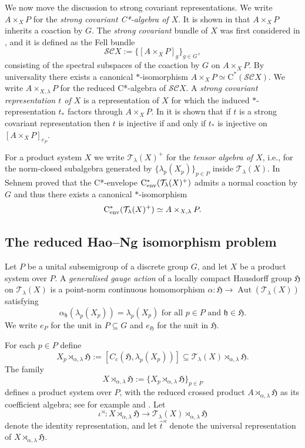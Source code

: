 \documentclass[11pt,final]{amsart}
\numberwithin{equation}{section}
\theoremstyle{plain}
\theoremstyle{definition}
\theoremstyle{remark}
\newcommand{\C}{{\mathcal{C}}}
\renewcommand{\S}{{\mathcal{S}}}
\newcommand{\T}{{\mathcal{T}}}
\def\al{\alpha}
\def\io{\iota}
\def\la{\lambda}
\newcommand{\fH}{{\mathfrak{H}}}
\newcommand{\fh}{{\mathfrak{h}}}
\newcommand{\foral}{\text{ for all }}
\newcommand{\ca}{\mathrm{C}^*}
\newcommand{\cenv}{\mathrm{C}^*_{\textup{env}}}
\newcommand{\wh}{\widehat}
\newcommand{\Aut}{\operatorname{Aut}}
\begin{document}
We now move the discussion to strong covariant representations.
We write $A \times_X P$ for the \emph{strong covariant C*-algebra of $X$}.
It is shown in \cite{Seh19} that $A \times_X P$ inherits a coaction by $G$.
The \emph{strong covariant} bundle of $X$ was first considered in \cite{DKKLL22}, and it is defined as the Fell bundle
\[
\S\C X := \Big\{ [A \times_X P]_g \Big\}_{g \in G},
\]
consisting of the spectral subspaces of the coaction by $G$ on $A \times_X P$.
By universality there exists a canonical $*$-isomorphism $A \times_X P\simeq \ca(\S\C X)$.
We write $A \times_{X, \la} P$ for the reduced C*-algebra of $\S\C X$.
A \emph{strong covariant representation $t$ of $X$} is a representation of $X$ for which the induced $*$-representation $t_\ast$ factors through $A \times_X P$. In \cite[Theorem~3.10]{Seh19} it is shown that if $t$ is a strong covariant representation then $t$ is injective if and only if $t_\ast$ is injective on $[A \times_X P]_{e_P}$.

For a product system $X$ we write $\T_\la(X)^+$ for the \emph{tensor algebra of $X$}, i.e., for the norm-closed subalgebra generated by $\{\la_p(X_p)\}_{p \in P}$ inside $\T_\la(X)$.
In \cite[Theorem~5.1]{Seh22} Sehnem proved that the C*-envelope $\cenv(\T_\la(X)^+)$ admits a normal coaction by $G$ and thus there exists a canonical $*$-isomorphism 
\[
\cenv(\T_\la(X)^+) \simeq A \times_{X, \la} P.
\]

\subsection{The reduced Hao--Ng isomorphism problem}

Let $P$ be a unital subsemigroup of a discrete group $G$, and let $X$ be a
product system over $P$.  A \emph{generalised gauge action} of a locally compact Hausdorff group $\fH$ on $\T_\la(X)$ is a point-norm continuous homomorphism
$\al \colon \fH\to\Aut(\T_\la(X))$ satisfying
\[
\al_{\fh}(\la_p(X_p))=\la_p(X_p)
\foral p\in P\text{ and }\fh\in\fH.
\]
We write $e_P$ for the unit in $P\subseteq G$ and $e_\fH$ for the unit in $\fH$.

For each $p\in P$ define
\[
X_p\rtimes_{\al,\la}\fH
:=[C_c(\fH,\la_p(X_p))]
\subseteq \T_\la(X)\rtimes_{\al,\la}\fH.
\]
The family
\[
X\rtimes_{\al,\la}\fH:=\{X_p\rtimes_{\al,\la}\fH\}_{p\in P}
\]
defines a product system over $P$, with the reduced crossed product $A\rtimes_{\al,\la}\fH$ as its coefficient algebra; see for example
\cite[Section~3]{Kat20} and \cite[Lemma~7.11]{KR19}.  Let
\[
\io^\rtimes \colon X\rtimes_{\al,\la}\fH
\to \T_\la(X) \rtimes_{\al,\la}\fH
\]
denote the identity representation, and let $\wh{t}^\rtimes$ denote the universal
representation of $X\rtimes_{\al,\la}\fH$.
\end{document}
